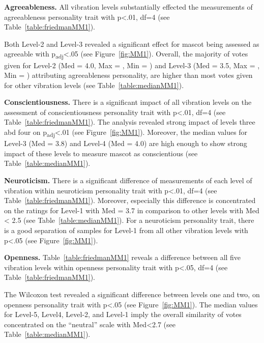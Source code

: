 \par\textbf{Agreeableness.}
All vibration levels substantially effected the measurements of agreeableness personality
trait with p<.01, df=4 (see Table~\ref{table:friedmanMM1}).

Both Level-2 and Level-3 revealed a significant effect for mascot being
assessed as agreeable with p\textsubscript{adj}<.05 (see Figure~\ref{fig:MM1}).
Overall, the majority of votes given for Level-2 (Med = 4.0, Max = , Min = ) and Level-3
(Med = 3.5, Max = , Min = ) attributing agreeableness personality, are higher than most
votes given for other vibration levels (see Table~\ref{table:medianMM1}).

\par\textbf{Conscientiousness.}
There is a significant impact of all vibration levels on the assessment of conscientiousness
personality trait with p<.01, df=4 (see Table~\ref{table:friedmanMM1}).
The analysis revealed strong impact of levels three abd four on p\textsubscript{adj}<.01 (see Figure~\ref{fig:MM1}).
Moreover, the median values for Level-3 (Med = 3.8) and Level-4 (Med = 4.0) are high enough
to show strong impact of these levels to measure mascot as conscientious (see Table~\ref{table:medianMM1}).

\par\textbf{Neuroticism.}
There is a significant difference of measurements of each level of vibration within neuroticism
personality trait with p<.01, df=4 (see Table~\ref{table:friedmanMM1}).
Moreover, especially this difference is concentrated on the ratings for Level-1 with Med = 3.7
in comparison to other levels with Med < 2.5 (see Table~\ref{table:medianMM1}).
For a neuroticism personality trait, there is a good separation of samples for Level-1
from all other vibration levels with p<.05 (see Figure~\ref{fig:MM1}).

\par\textbf{Openness.}
Table~\ref{table:friedmanMM1} reveals a difference between all five vibration levels within
openness personality trait with p<.05, df=4 (see Table~\ref{table:friedmanMM1}).

The Wilcoxon test revealed a significant difference between levels one and two, on
openness personality trait with p<.05 (see Figure~\ref{fig:MM1}).
The median values for Level-5, Level4, Level-2, and Level-1 imply the overall
similarity of votes concentrated on the “neutral” scale with Med<2.7 (see Table~\ref{table:medianMM1}).

